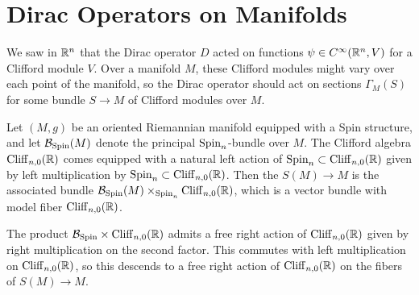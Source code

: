 %
\section{Dirac Operators on Manifolds}
%
We saw in $\mathbb{R}^n$ that the Dirac operator $D$ acted on functions
$\psi \in C^\infty(\mathbb{R}^n, V)$ for a Clifford module $V$. Over a manifold $M$,
these Clifford modules might vary over each point of the manifold, so the
Dirac operator should act on sections $\Gamma_M(S)$ for some bundle $S \to M$
of Clifford modules over $M$.
%
\begin{defn}
Let $(M,g)$ be an oriented Riemannian manifold equipped with a Spin structure,
and let $\mathcal{B}_{\mathrm{Spin}}(M)$ denote the principal $\mathrm{Spin}_n$-bundle over $M$.
The Clifford algebra $\operatorname{Cliff}_{n,0}(\mathbb{R})$ comes equipped with a natural left
action of $\mathrm{Spin}_n \subset \operatorname{Cliff}_{n,0}(\mathbb{R})$ given by left multiplication by
$\mathrm{Spin}_n \subset \operatorname{Cliff}_{n,0}(\mathbb{R})$. Then the  $S(M) \to M$ is
the associated bundle $\mathcal{B}_{\mathrm{Spin}}(M) \times_{\mathrm{Spin}_n} \operatorname{Cliff}_{n,0}(\mathbb{R})$,
which is a vector bundle with model fiber $\operatorname{Cliff}_{n,0}(\mathbb{R})$.
\end{defn}
%
The product $\mathcal{B}_{\mathrm{Spin}} \times \operatorname{Cliff}_{n,0}(\mathbb{R})$ admits a free right action of
$\operatorname{Cliff}_{n,0}(\mathbb{R})$ given by right multiplication on the second factor. This
commutes with left multiplication on $\operatorname{Cliff}_{n,0}(\mathbb{R})$, so this descends to a
free right action of $\operatorname{Cliff}_{n,0}(\mathbb{R})$ on the fibers of $S(M) \to M$.
